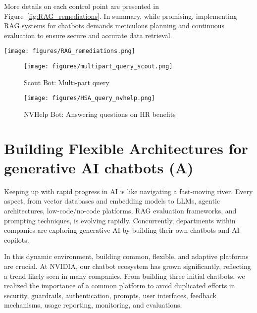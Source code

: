 \documentclass[sigconf]{acmart}
\begin{document}
More details on each control point are presented in Figure~\ref{fig:RAG_remediations}. In summary, while promising, implementing RAG systems for chatbots demands meticulous planning and continuous evaluation to ensure secure and accurate data retrieval.
 

\begin{figure*}[t]
    \centering
    \texttt{[image: figures/RAG\_remediations.png]}
    \vspace{-3mm}
    \caption{RAG control points, challenges, and remediations}
    \vspace{-3mm}
    \label{fig:RAG_remediations}
\end{figure*}

\begin{figure}[t]
  \texttt{[image: figures/multipart\_query\_scout.png]}
  \vspace{-3mm}
  \caption{Scout Bot: Multi-part query}
  \label{fig:scout_multipart_query}
  \vspace{-3mm}
\end{figure}

\begin{figure}[h]
  \texttt{[image: figures/HSA\_query\_nvhelp.png]}
  \vspace{-3mm}
  \caption{NVHelp Bot: Answering questions on HR benefits}
  \vspace{-3mm}
  \label{fig:nvhelp_bot}
\end{figure}

\vspace{-3mm}
\section{Building Flexible Architectures for generative AI chatbots (A)}

Keeping up with rapid progress in AI is like navigating a fast-moving river. Every aspect, from vector databases and embedding models to LLMs, agentic architectures, low-code/no-code platforms, RAG evaluation frameworks, and prompting techniques, is evolving rapidly. Concurrently, departments within companies are exploring generative AI by building their own chatbots and AI copilots.

In this dynamic environment, building common, flexible, and adaptive platforms are crucial. At NVIDIA, our chatbot ecosystem has grown significantly, reflecting a trend likely seen in many companies. From building three initial chatbots, we realized the importance of a common platform to avoid duplicated efforts in security, guardrails, authentication, prompts, user interfaces, feedback mechanisms, usage reporting, monitoring, and evaluations.
\end{document}
